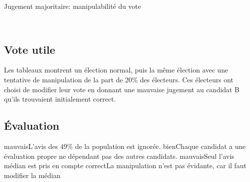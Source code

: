 \documentclass[../report]{subfiles}
\begin{document}
  \begin{table}[H]
    \begin{center}
      \caption{Jugement majoritaire: manipulabilité du vote}%
      \label{fig:diff:jugmaj:caslim1}
      \\[1em]
    \end{center}
  \end{table}
  \subsection{Vote utile}

  Les tableaux  montrent un élection normal, puis la même élection avec une tentative
  de manipulation de la part de 20\% des électeurs. 
  Ces électeurs ont choisi de modifier leur vote en donnant une mauvaise jugement au candidat B qu'ils trouvaient 
  initialement correct.

  \subsection{Évaluation}
  \tabcritere%
    {mauvais}{L'avis des 49\% de la population est ignorée.}%
    {bien}{Chaque candidat a une évaluation propre ne dépendant pas des autres candidats.}%
    {mauvais}{Seul l'avis médian est pris en compte}%
    {correct}{La manipulation n'est pas évidante, car il faut modifier la médian}
\end{document}
